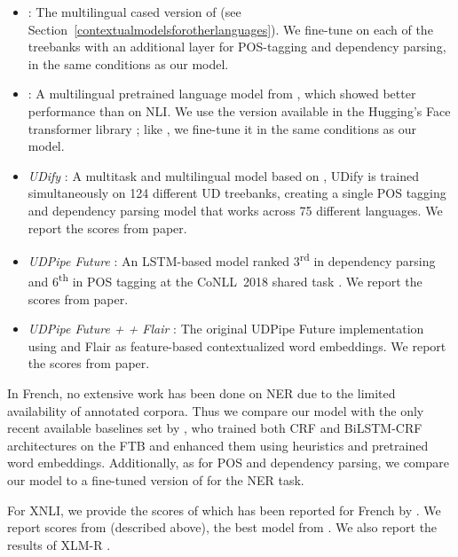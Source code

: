 \begin{itemize}
    \item \emph{\mbert}: The multilingual cased version of \bert (see Section~\ref{contextualmodelsforotherlanguages}). We fine-tune \mbert on each of the treebanks with an additional layer for POS-tagging and dependency parsing, in the same conditions as our \camembert model.
    \item \emph{\xlmmlmtlm}: A multilingual pretrained language model from \citet{conneau-lample-2019-cross}, which showed better performance than \mbert on NLI. We use the version available in the Hugging's Face transformer library \cite{wolf-etal-2019-huggingface}; like \mbert, we fine-tune it in the same conditions as our model.
    \item \emph{UDify} \cite{kondratyuk-straka-2019-75}: A multitask and multilingual model based on \mbert, UDify is trained simultaneously on 124 different UD treebanks, creating a single POS tagging and dependency parsing model that works across 75 different languages. We report the scores from \citet{kondratyuk-straka-2019-75} paper.
    \item \emph{UDPipe Future} \citep{straka-2018-udpipe}: An LSTM-based model ranked 3\textsuperscript{rd} in dependency parsing and 6\textsuperscript{th} in POS tagging at the CoNLL~2018 shared task \citep{seker-etal-2018-universal}. We report the scores from \citet{kondratyuk-straka-2019-75} paper.
    \item \emph{UDPipe Future + \mbert + Flair} \citep{straka-strakova-2019-evaluating}: The original UDPipe Future implementation using \mbert and Flair as feature-based contextualized word embeddings. We report the scores from \citet{straka-strakova-2019-evaluating} paper.
\end{itemize}

In French, no extensive work has been done on NER due to the limited availability of annotated corpora. Thus we compare our model with the only recent available baselines set by \citet{dupont-2017-exploration}, who trained both CRF \citep{lafferty-etal-2001-conditional} and BiLSTM-CRF \citep{lample-etal-2016-neural} architectures on the FTB and enhanced them using heuristics and pretrained word embeddings. Additionally, as for POS and dependency parsing, we compare our model to a fine-tuned version of \mbert for the NER task.

For XNLI, we provide the scores of \mbert which has been reported for French by \citet{wu-dredze-2019-beto}.
We report scores from \xlmmlmtlm (described above), the best model from \citet{conneau-lample-2019-cross}. %
We also report the results of \mbox{XLM-R} \cite{conneau-etal-2020-unsupervised}.

